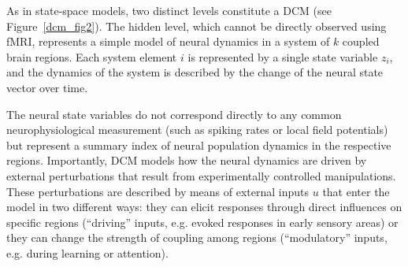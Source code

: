 As in state-space models, two distinct levels constitute a DCM (see Figure~\ref{dcm_fig2}).  The hidden level, which cannot be directly observed using fMRI, represents a simple model of neural dynamics in a system of $k$ coupled brain regions.  Each system element $i$ is represented by a single state variable $z_i$, and the dynamics of the system is described by the change of the neural state vector  over time.

The neural state variables do not correspond directly to any common neurophysiological measurement (such as spiking rates or local field potentials) but represent a summary index of neural population dynamics in the respective regions.  Importantly, DCM models how the neural dynamics are driven by external perturbations that result from experimentally controlled manipulations.  These perturbations are described by means of external inputs $u$ that enter the model in two different ways:  they can elicit responses through direct influences on specific regions (``driving'' inputs, e.g. evoked responses in early sensory areas) or they can change the strength of coupling among regions (``modulatory'' inputs, e.g. during learning or attention).

